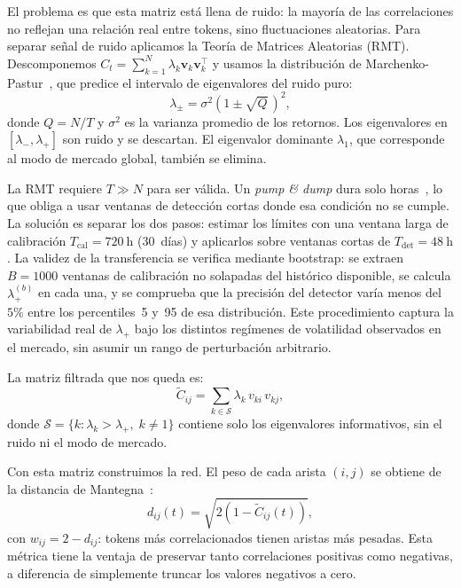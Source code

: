 El problema es que esta matriz está llena de ruido: la mayoría de las
correlaciones no reflejan una relación real entre tokens, sino fluctuaciones
aleatorias. Para separar señal de ruido aplicamos la Teoría de Matrices
Aleatorias (RMT). Descomponemos $C_t = \sum_{k=1}^{N} \lambda_k
\mathbf{v}_k \mathbf{v}_k^\top$ y usamos la distribución de
Marchenko-Pastur~\cite{plerou1999}, que predice el intervalo de eigenvalores
del ruido puro:
\begin{equation}
  \lambda_{\pm} = \sigma^2\!\left(1 \pm \sqrt{Q}\,\right)^{\!2},
  \label{eq:mp}
\end{equation}
donde $Q = N/T$ y $\sigma^2$ es la varianza promedio de los retornos.
Los eigenvalores en $[\lambda_-, \lambda_+]$ son ruido y se descartan.
El eigenvalor dominante $\lambda_1$, que corresponde al modo de mercado
global, también se elimina.

La RMT requiere $T \gg N$ para ser válida. Un \emph{pump \& dump} dura
solo horas~\cite{lamorgia2020}, lo que obliga a usar ventanas de detección
cortas donde esa condición no se cumple. La solución es separar los dos
pasos: estimar los límites con una ventana larga de calibración
$T_{\text{cal}} = 720~\text{h}$ (30~días) y aplicarlos sobre ventanas
cortas de $T_{\text{det}} = 48~\text{h}$. La validez de la transferencia
se verifica mediante bootstrap: se extraen $B = 1000$ ventanas de
calibración no solapadas del histórico disponible, se calcula
$\lambda_+^{(b)}$ en cada una, y se comprueba que la precisión del
detector varía menos del $5\%$ entre los percentiles~5 y~95 de esa
distribución. Este procedimiento captura la variabilidad real de
$\lambda_+$ bajo los distintos regímenes de volatilidad observados en el
mercado, sin asumir un rango de perturbación arbitrario.

La matriz filtrada que nos queda es:
\begin{equation}
  \tilde{C}_{ij} = \sum_{k \in \mathcal{S}} \lambda_k\, v_{ki}\, v_{kj},
  \label{eq:Ctilde}
\end{equation}
donde $\mathcal{S} = \{k : \lambda_k > \lambda_+,\; k \neq 1\}$ contiene solo
los eigenvalores informativos, sin el ruido ni el modo de mercado.

Con esta matriz construimos la red. El peso de cada arista $(i,j)$ se obtiene
de la distancia de Mantegna~\cite{mantegna1999}:
\begin{equation}
  d_{ij}(t) = \sqrt{2\left(1 - \tilde{C}_{ij}(t)\right)},
  \label{eq:mantegna}
\end{equation}
con $w_{ij} = 2 - d_{ij}$: tokens más correlacionados tienen aristas más
pesadas. Esta métrica tiene la ventaja de preservar tanto correlaciones
positivas como negativas, a diferencia de simplemente truncar los valores
negativos a cero.

